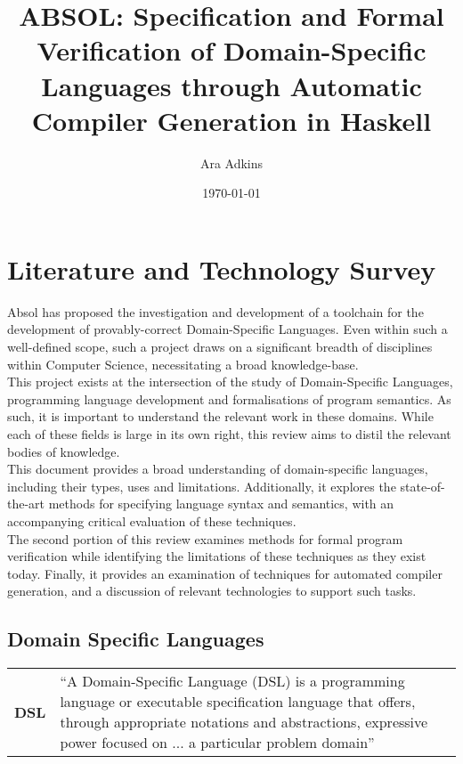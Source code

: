 \documentclass[a4paper,11pt]{report}
\title{ABSOL: Specification and Formal Verification of Domain-Specific Languages through Automatic Compiler Generation in Haskell}
\author{Ara Adkins}
\date{\today}
\newcommand{\defblock}[3]{
    \begin{longtable}{l p{#1}} 
        \textbf{#2} & #3
    \end{longtable}
}
\begin{document}
\maketitle

\tableofcontents

\printglossaries

\chapter{Literature and Technology Survey} %
\label{cha:literature_and_technology_survey}
Absol has proposed the investigation and development of a toolchain for the development of provably-correct Domain-Specific Languages. 
Even within such a well-defined scope, such a project draws on a significant breadth of disciplines within Computer Science, necessitating a broad knowledge-base.\\

This project exists at the intersection of the study of Domain-Specific Languages, programming language development and formalisations of program semantics. 
As such, it is important to understand the relevant work in these domains. 
While each of these fields is large in its own right, this review aims to distil the relevant bodies of knowledge. \\

This document provides a broad understanding of domain-specific languages, including their types, uses and limitations.
Additionally, it explores the state-of-the-art methods for specifying language syntax and semantics, with an accompanying critical evaluation of these techniques.\\

The second portion of this review examines methods for formal program verification while identifying the limitations of these techniques as they exist today. 
Finally, it provides an examination of techniques for automated compiler generation, and a discussion of relevant technologies to support such tasks. 

\section{Domain Specific Languages} %
\label{sec:domain_specific_languages}
\defblock{12cm}{DSL}{``A Domain-Specific Language (DSL) is a programming language or executable specification language that offers, through appropriate notations and abstractions, expressive power focused on ... a particular problem domain'' \citep{van2000domain}}
\end{document}
